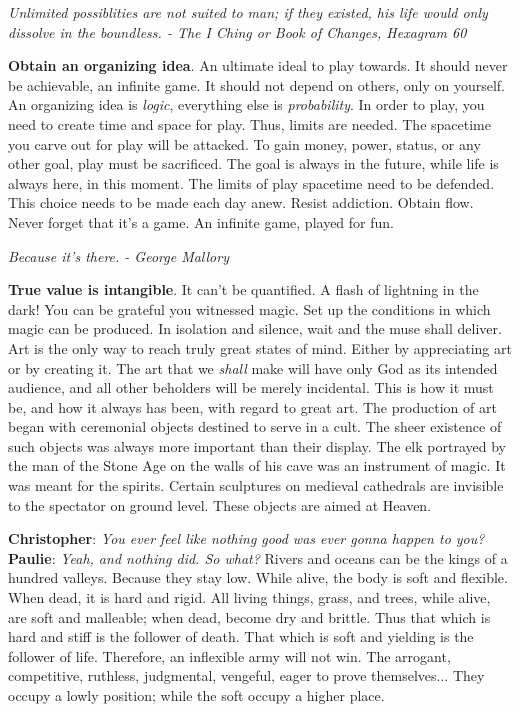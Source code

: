 \documentclass[a4paper,hidelinks]{article}
\begin{document}
\begin{center}
\textit{
Unlimited possiblities are not suited to man; if they existed, his life would only dissolve in the boundless. - The I Ching or Book of Changes, Hexagram 60
}
\end{center}

\textbf{Obtain an organizing idea}.
An ultimate ideal to play towards.
It should never be achievable, an infinite game.
It should not depend on others, only on yourself.
An organizing idea is \textit{logic}, everything else is \textit{probability}.
In order to play, you need to create time and space for play.
Thus, limits are needed.
The spacetime you carve out for play will be attacked.
To gain money, power, status, or any other goal, play must be sacrificed.
The goal is always in the future, while life is always here, in this moment.
The limits of play spacetime need to be defended.
This choice needs to be made each day anew.
Resist addiction.
Obtain flow.
Never forget that it's a game.
An infinite game, played for fun.

\newpage

\begin{center}
\textit{
Because it's there. - George Mallory
}
\end{center}

\textbf{True value is intangible}.
It can't be quantified.
A flash of lightning in the dark!
You can be grateful you witnessed magic.
Set up the conditions in which magic can be produced.
In isolation and silence, wait and the muse shall deliver.
Art is the only way to reach truly great states of mind.
Either by appreciating art or by creating it.
The art that we \textit{shall} make will have only God as its intended audience, and all other beholders will be merely incidental.
This is how it must be, and how it always has been, with regard to great art.
The production of art began with ceremonial objects destined to serve in a cult.
The sheer existence of such objects was always more important than their display.
The elk portrayed by the man of the Stone Age on the walls of his cave was an instrument of magic.
It was meant for the spirits.
Certain sculptures on medieval cathedrals are invisible to the spectator on ground level.
These objects are aimed at Heaven.

\newpage

{\setlength\parindent{0pt}
\textbf{Christopher}: \textit{You ever feel like nothing good was ever gonna happen to you?}
\textbf{Paulie}: \textit{Yeah, and nothing did. So what?}
}
\newline
\newline
Rivers and oceans can be the kings of a hundred valleys.
Because they stay low.
While alive, the body is soft and flexible.
When dead, it is hard and rigid.
All living things, grass, and trees, while alive, are soft and malleable; when dead, become dry and brittle.
Thus that which is hard and stiff is the follower of death.
That which is soft and yielding is the follower of life.
Therefore, an inflexible army will not win.
The arrogant, competitive, ruthless, judgmental, vengeful, eager to prove themselves...
They occupy a lowly position; while the soft occupy a higher place.
\end{document}
